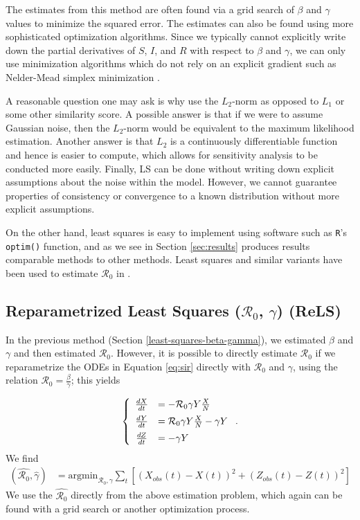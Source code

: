 \documentclass[12pt]{article}
\newcommand{\rr}{\ensuremath{\mathcal{R}_0}}
\begin{document}
The estimates from this method are often found via a grid search of $\beta$ and $\gamma$ values to minimize the squared error.  The estimates can also be found using more sophisticated optimization algorithms. Since we typically cannot explicitly write down the partial derivatives of $S$, $I$, and $R$ with respect to $\beta$ and $\gamma$, we can only use minimization algorithms which do not rely on an explicit gradient such as Nelder-Mead simplex minimization \citep{nelder-mead1965}.

A reasonable question one may ask is why use the $L_2$-norm as opposed to $L_1$ or some other similarity score.  A possible answer is that if we were to assume Gaussian noise, then the $L_2$-norm would be equivalent to the maximum likelihood estimation.  Another answer is that $L_2$ is a continuously differentiable function and hence is easier to compute, which allows for sensitivity analysis to  be conducted more easily.  Finally, LS can be done without writing down explicit assumptions about the noise within the model.  However, we cannot guarantee properties of consistency or convergence to a known distribution without more explicit assumptions.  

On the other hand, least squares is easy to implement using software such as \texttt{R}'s \texttt{optim()} function, and as we see in Section \ref{sec:results} produces results comparable methods to other methods.  Least squares and similar variants have been used to estimate $\rr$ in \cite{majumder2016}.

\subsection{Reparametrized Least Squares ($\rr$, $\gamma$) (ReLS)}\label{reparametrized-least-squares-rux5f0-gamma}

In the previous method (Section \ref{least-squares-beta-gamma}), we estimated $\beta$ and $\gamma$ and then estimated $\rr$.  However, it is possible to directly estimate $\rr$ if we reparametrize the ODEs in Equation \eqref{eq:sir} directly with \(\rr\) and \(\gamma\), using the relation $\rr = \frac{\beta}{\gamma}$; this yields

\begin{align*}
  \left \{
  \begin{array}{cl}
    \frac{dX}{dt} &= - \rr \gamma Y \frac{X}{N}\vspace{.5em}\\
    \frac{dY}{dt} &=  \rr \gamma Y \frac{X}{N}  - \gamma Y\vspace{.5em} \\
    \frac{dZ}{dt} &=  - \gamma Y 
  \end{array}
  \right . .
  \end{align*}
We find
\begin{align}
(\hat{\rr}, \hat{\gamma} ) &= \text{argmin}_{\rr, \gamma} \sum_{t} \left [ \left (X_{obs}(t) - X(t)\right )^2 + \left ( Z_{obs}(t) - Z(t) \right )^2 \right ]
\end{align}
We use the $\hat{\rr}$ directly from the above estimation problem, which again can be found with a grid search or another optimization process.
\end{document}
